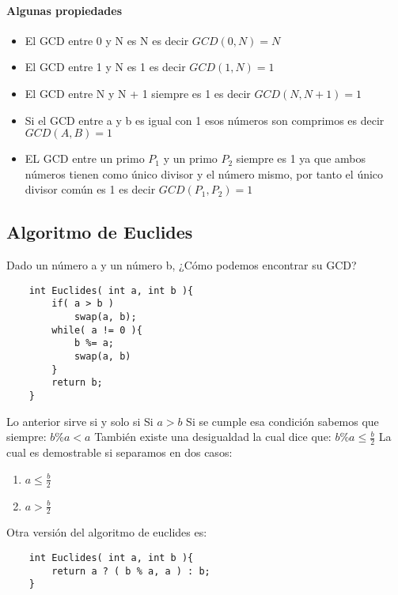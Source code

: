 \paragraph{Algunas propiedades}
\begin{itemize}
    \item {El GCD entre 0 y N es N es decir $GCD(0, N) = N$}
    \item {El GCD entre 1 y N es 1 es decir $GCD(1, N) = 1$}
    \item {El GCD entre N y N + 1 siempre es 1 es decir $GCD(N, N + 1) = 1$}
    \item {Si el GCD entre a y b es igual con 1 esos números son comprimos es decir $GCD(A, B) = 1$}
    \item {EL GCD entre un primo $P_{1}$ y un primo $P_{2}$ siempre es 1 ya que ambos números tienen como único divisor y el número mismo, por tanto el único divisor común es 1 es decir $GCD(P_{1}, P_{2}) = 1$}
\end{itemize}

\subsection{Algoritmo de Euclides}
Dado un número a y un número b, ¿Cómo podemos encontrar su GCD?
\begin{lstlisting}
    int Euclides( int a, int b ){
        if( a > b )
            swap(a, b);
        while( a != 0 ){
            b %= a;
            swap(a, b)
        }
        return b;
    }
\end{lstlisting}
Lo anterior sirve si y solo si 
Si $a > b$ \newline
Si se cumple esa condición sabemos que siempre:
$b \% a < a$ \newline
También existe una desigualdad la cual dice que:
$b \% a \leq \frac{b}{2}$ \newline
La cual es demostrable si separamos en dos casos:
\begin{enumerate}
    \item {$a \leq \frac{b}{2}$}
    \item {$a > \frac{b}{2}$}
\end{enumerate}

Otra versión del algoritmo de euclides es:

\begin{lstlisting}
    int Euclides( int a, int b ){
        return a ? ( b % a, a ) : b;
    }
\end{lstlisting}

